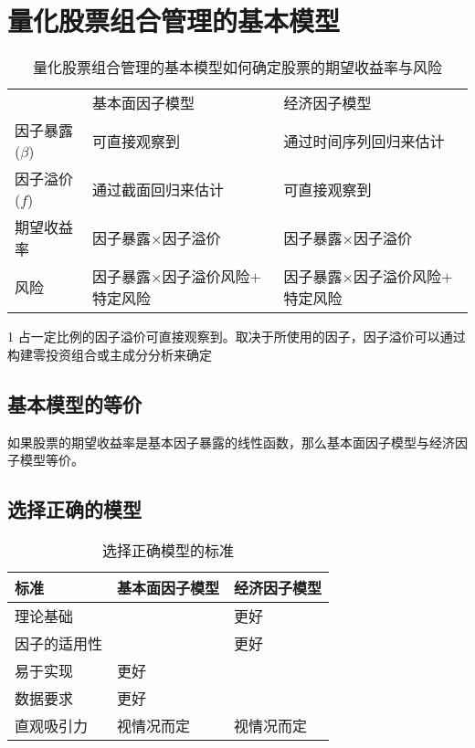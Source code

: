 \chapter{量化股票组合管理的基本模型}
\begin{table}
    \begin{threeparttable}

        \centering
        \caption{量化股票组合管理的基本模型如何确定股票的期望收益率与风险}
        \begin{tabular}{lll}
            \hline
                          & 基本面因子模型                   & 经济因子模型                    \\
            因子暴露($\beta$) & 可直接观察到                    & 通过时间序列回归来估计               \\
            因子溢价($f$)     & 通过截面回归来估计                 & 可直接观察到\tnote{1}           \\
            期望收益率         & 因子暴露$\times$因子溢价          & 因子暴露$\times$因子溢价          \\
            风险            & 因子暴露$\times$因子溢价风险$+$特定风险 & 因子暴露$\times$因子溢价风险$+$特定风险 \\
            \hline
        \end{tabular}
        \begin{tablenotes}
            \footnotesize
            \item[1] 占一定比例的因子溢价可直接观察到。取决于所使用的因子，因子溢价可以通过构建零投资组合或主成分分析来确定
        \end{tablenotes}
    \end{threeparttable}
\end{table}
\section{基本模型的等价}
\begin{lemma}
    如果股票的期望收益率是基本因子暴露的线性函数，那么基本面因子模型与经济因子模型等价。
\end{lemma}
\section{选择正确的模型}
\begin{table}
    \centering\caption{选择正确模型的标准}
    \begin{tabular}{lll}
        \hline
        标准     & 基本面因子模型 & 经济因子模型 \\
        \hline
        理论基础   &         & 更好     \\
        因子的适用性 &         & 更好     \\
        易于实现   & 更好      &        \\
        数据要求   & 更好      &        \\
        直观吸引力  & 视情况而定   & 视情况而定  \\
        \hline
    \end{tabular}
\end{table}